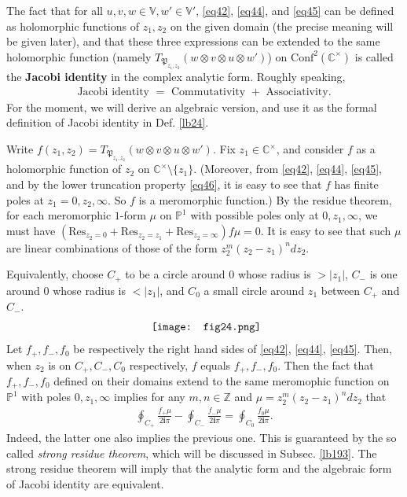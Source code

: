 \documentclass[12pt,a4paper,notitlepage]{article}
\theoremstyle{definition}
\theoremstyle{plain}
\newcommand{\fk}{\mathfrak}
\newcommand{\Conf}{\mathrm{Conf}}
\newcommand{\Res}{\mathrm{Res}}
\newcommand{\im}{\mathbf{i}}
\newcommand{\Vbb}{\mathbb V}
\newcommand{\Cbb}{\mathbb C}
\newcommand{\Zbb}{\mathbb Z}
\newcommand{\Pbb}{\mathbb P}
\numberwithin{equation}{section}
\begin{document}
The fact that for all $u,v,w\in\Vbb,w'\in\Vbb'$, \eqref{eq42}, \eqref{eq44}, and \eqref{eq45} can be defined as holomorphic functions of $z_1,z_2$ on the given domain (the precise meaning will be given later), and that these three expressions can be extended to the same holomorphic function (namely $T_{\fk P_{z_1,z_2}}(w\otimes v\otimes u\otimes w')$) on $\Conf^2(\Cbb^\times)$ is called the \textbf{Jacobi identity} in the complex analytic form. Roughly speaking,
\begin{align}
\text{Jacobi identity $=$ Commutativity $+$ Associativity}.\label{eq73}
\end{align}
For the moment, we will derive an algebraic version, and use it as the formal definition of Jacobi identity in Def. \ref{lb24}. 

Write $f(z_1,z_2)=T_{\fk P_{z_1,z_2}}(w\otimes v\otimes u\otimes w')$.  Fix $z_1\in \Cbb^\times$, and consider $f$ as a holomorphic function of $z_2$ on $\Cbb^\times\setminus\{z_1\}$. (Moreover, from \eqref{eq42}, \eqref{eq44}, \eqref{eq45}, and by the lower truncation property \eqref{eq46}, it is easy to see that $f$ has finite poles at $z_1=0,z_2,\infty$. So $f$ is a meromorphic function.) By the residue theorem, for each meromorphic  $1$-form $\mu$ on $\Pbb^1$ with possible poles only at $0,z_1,\infty$, we must have $(\Res_{z_2=0}+\Res_{z_2=z_1}+\Res_{z_2=\infty})f\mu=0$. It is easy to see that such $\mu$ are linear combinations of those of the form $z_2^m(z_2-z_1)^ndz_2$.

Equivalently, choose $C_+$ to be a circle around $0$ whose radius is  $>|z_1|$, $C_-$ is one around $0$ whose radius is $<|z_1|$, and $C_0$  a small circle around $z_1$ between $C_+$ and $C_-$. 
\begin{align*}
	\vcenter{\hbox{{
				\texttt{[image: fig24.png]}}}}
\end{align*}
Let $f_+,f_-,f_0$ be respectively the right hand sides of \eqref{eq42}, \eqref{eq44}, \eqref{eq45}. Then, when $z_2$ is on $C_+,C_-,C_0$ respectively, $f$ equals $f_+,f_-,f_0$. Then the fact that $f_+,f_-,f_0$ defined on their domains extend to the same meromophic function on $\Pbb^1$ with poles $0,z_1,\infty$ implies for any $m,n\in\Zbb$ and $\mu=z_2^m(z_2-z_1)^ndz_2$ that
\begin{align}
	\oint_{C_+}\frac{f_+\mu}{2\im\pi} -\oint_{C_-}\frac{f_-\mu}{2\im\pi}=\oint_{C_0} \frac{f_0\mu}{2\im\pi}.\label{eq48}
\end{align}
Indeed, the latter one also implies the previous one. This is guaranteed by the so called \emph{strong residue theorem}, which will be discussed in Subsec. \ref{lb193}. The strong residue theorem will imply that the analytic form and the algebraic form of Jacobi identity are equivalent.
\end{document}
